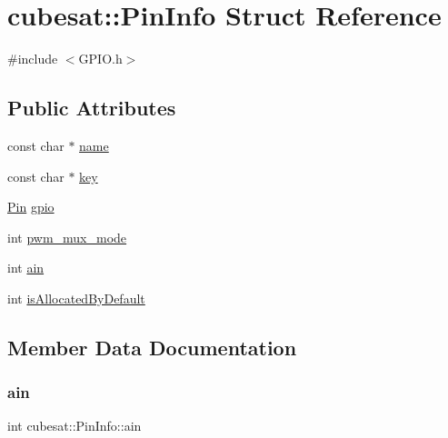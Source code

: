 \hypertarget{structcubesat_1_1PinInfo}{}\section{cubesat\+:\+:Pin\+Info Struct Reference}
\label{structcubesat_1_1PinInfo}


{\ttfamily \#include $<$G\+P\+I\+O.\+h$>$}

\subsection*{Public Attributes}
\begin{DoxyCompactItemize}
\item 
const char $\ast$ \hyperlink{structcubesat_1_1PinInfo_aa3d90d09c4265b07b2fe523300d89d2b}{name}
\item 
const char $\ast$ \hyperlink{structcubesat_1_1PinInfo_a5336be9370a0ae23256fbe715217dc9b}{key}
\item 
\hyperlink{namespacecubesat_af928ed4b56ef60d75953a91225b37a00}{Pin} \hyperlink{structcubesat_1_1PinInfo_ab81fbc40928199ff436a40b58e780ce4}{gpio}
\item 
int \hyperlink{structcubesat_1_1PinInfo_a7f8c9d7e69fea74ccec40ed3cbbbac4b}{pwm\+\_\+mux\+\_\+mode}
\item 
int \hyperlink{structcubesat_1_1PinInfo_aeae977c2657f5e26cd112272255ef276}{ain}
\item 
int \hyperlink{structcubesat_1_1PinInfo_aab65aaa102e8b854c5f928f1adb30a37}{is\+Allocated\+By\+Default}
\end{DoxyCompactItemize}


\subsection{Member Data Documentation}
\mbox{\label{structcubesat_1_1PinInfo_aeae977c2657f5e26cd112272255ef276}} 
\subsubsection{\texorpdfstring{ain}{ain}}
{\footnotesize\ttfamily int cubesat\+::\+Pin\+Info\+::ain}

\mbox{\label{structcubesat_1_1PinInfo_ab81fbc40928199ff436a40b58e780ce4}} 
